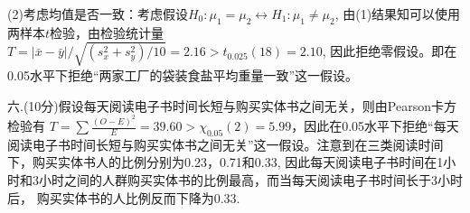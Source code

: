 \documentclass[12pt]{article}
\begin{document}
(2)考虑均值是否一致：考虑假设$H_0:\mu_1=\mu_2\leftrightarrow H_1:\mu_1\ne\mu_2$, 由(1)结果知可以使用两样本$t$检验，由检验统计量$T=|\bar{x}-\bar{y}|/\sqrt{(s^2_x+s^2_y)/10}
 =2.16>t_{0.025}(18)=2.10$, 因此拒绝零假设。即在0.05水平下拒绝“两家工厂的袋装食盐平均重量一致”这一假设。

六.(10分)假设每天阅读电子书时间长短与购买实体书之间无关，则由Pearson卡方检验有
 $T=\sum\frac{(O-E)^2}{E}=39.60>\chi_{0.05}(2)=5.99$，因此在0.05水平下拒绝“每天阅读电子书时间长短与购买实体书之间无关”这一假设。注意到在三类阅读时间下，购买实体书人的比例分别为0.23，0.71和0.33, 因此每天阅读电子书时间在1小时和3小时之间的人群购买实体书的比例最高，而当每天阅读电子书时间长于3小时后， 购买实体书的人比例反而下降为0.33.
\end{document}
